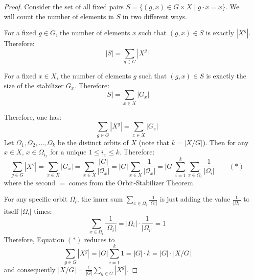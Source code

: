 \begin{proof}
Consider the set of all fixed pairs $S = \{ (g, x) \in G \times X \mid g \cdot x = x \}$. We will count the number of elements in $S$ in two different ways.

For a fixed $g \in G$, the number of elements $x$ such that $(g, x) \in S$ is exactly $|X^g|$. Therefore:
\[ |S| = \sum_{g \in G} |X^g| \]

For a fixed $x \in X$, the number of elements $g$ such that $(g, x) \in S$ is exactly the size of the stabilizer $G_x$. Therefore:
\[ |S| = \sum_{x \in X} |G_x| \]

Therefore, one has:
\[ \sum_{g \in G} |X^g| = \sum_{x \in X} |G_x| \]
Let $\Omega_1, \Omega_2, \dots, \Omega_k$ be the distinct orbits of $X$ (note that $k = |X/G|$). Then for any $x \in X$, $x \in \Omega_{i_x}$ for a unique $1 \leq i_x \leq k$. Therefore:
\[ \sum_{g \in G} |X^g|  = \sum_{x \in X} |G_x|= \sum_{x \in X} \frac{|G|}{|\mathcal{O}_x|} = |G| \sum_{x \in X} \frac{1}{|\mathcal{O}_x|}  = |G|\sum_{i=1}^k \sum_{x \in \Omega_i} \frac{1}{|\Omega_i|}  \quad \quad (*)\]
where the second $=$ comes from the Orbit-Stabilizer Theorem.

For any specific orbit $\Omega_i$, the inner sum $\sum_{x \in \Omega_i} \frac{1}{|\Omega_i|}$ is just adding the value $\frac{1}{|\Omega_i|}$ to itself $|\Omega_i|$ times:
\[ \sum_{x \in \Omega_i} \frac{1}{|\Omega_i|} = |\Omega_i| \cdot \frac{1}{|\Omega_i|} = 1 \]
Therefore, Equation $(*)$ reduces to
\[ \sum_{g \in G} |X^g| = |G|\sum_{i=1}^k 1 = |G| \cdot k = |G| \cdot |X/G| \]
and consequently \( |X/G| = \frac{1}{|G|} \sum_{g \in G} |X^g| \).
\end{proof}


